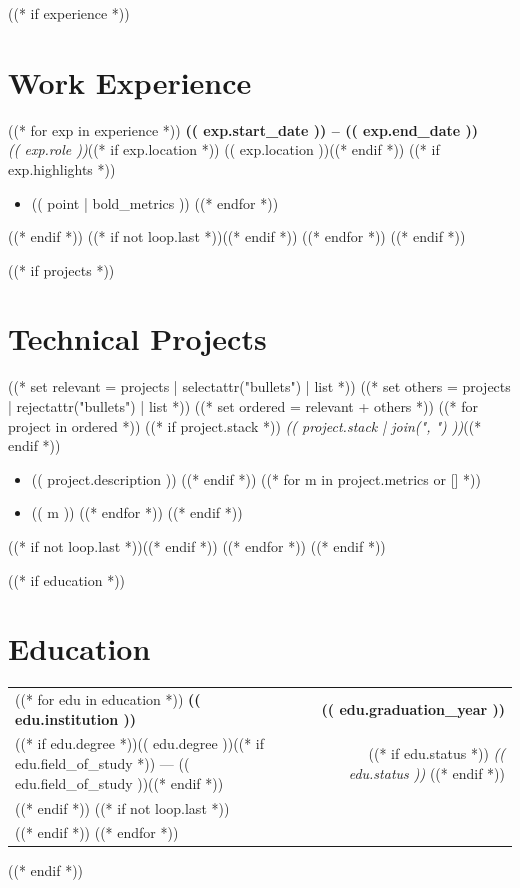 \documentclass[11pt,a4paper]{article}
\begin{document}
((* if experience *))
\section*{Work Experience}
((* for exp in experience *))
 \hfill {\small \textbf{(( exp.start_date )) -- (( exp.end_date ))}}\\
{\small \textit{(( exp.role ))}}((* if exp.location *)) \hfill {\small (( exp.location ))}((* endif *))
((* if exp.highlights *))
\begin{itemize}[topsep=2pt]
((* for point in exp.highlights *))
    \item {\small (( point | bold_metrics ))}
((* endfor *))
\end{itemize}
((* endif *))
((* if not loop.last *))\vspace{3pt}((* endif *))
((* endfor *))
((* endif *))

((* if projects *))
\section*{Technical Projects}
((* set relevant = projects | selectattr("bullets") | list *))
((* set others   = projects | rejectattr("bullets") | list *))
((* set ordered  = relevant + others *))
((* for project in ordered *))
((* if project.stack *)) \hfill {\small \textit{(( project.stack | join(", ") ))}}((* endif *))
\begin{itemize}[topsep=2pt]
((* if project.bullets *))
(( project.bullets ))
((* elif project.description or project.metrics *))
((* if project.description *))
    \item {\small (( project.description ))}
((* endif *))
((* for m in project.metrics or [] *))
    \item {\small (( m ))}
((* endfor *))
((* endif *))
\end{itemize}
((* if not loop.last *))\vspace{2pt}((* endif *))
((* endfor *))
((* endif *))

((* if education *))
\section*{Education}
\begin{tabularx}{\textwidth}{Xr}
((* for edu in education *))
    {\small \textbf{(( edu.institution ))}} & {\small \textbf{(( edu.graduation_year ))}} \\
    ((* if edu.degree *)){\small (( edu.degree ))((* if edu.field_of_study *)) --- (( edu.field_of_study ))((* endif *))} & {\small ((* if edu.status *)) \textit{(( edu.status ))} ((* endif *))} \\((* endif *))
    ((* if not loop.last *))\vspace{1pt} \\((* endif *))
((* endfor *))
\end{tabularx}
((* endif *))
\end{document}
